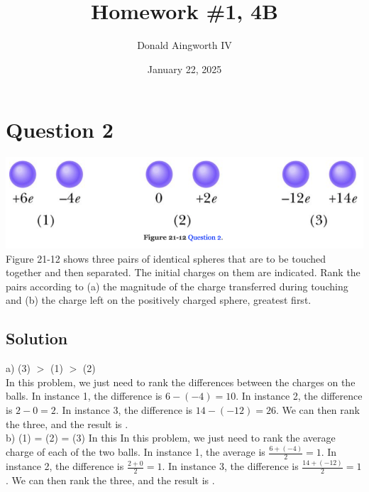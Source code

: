 \documentclass[12pt]{article}
\title{Homework \#1, 4B}
\author{Donald Aingworth IV}
\date{January 22, 2025}
\begin{document}

\maketitle

\pagebreak
\section*{Question 2}
\includegraphics[width=\textwidth]{picture_1.png}
Figure 21-12 shows three pairs of identical spheres that are to be touched together and then separated. The initial charges on them are indicated. Rank the pairs according to (a) the magnitude of the charge transferred during touching and (b) the charge left on the positively charged sphere, greatest first.

\subsection*{Solution}
a) (3) $>$ (1) $>$ (2)\\
In this problem, we just need to rank the differences between the charges on the balls. In instance 1, the difference is $6 - (-4) = 10$. In instance 2, the difference is $2 - 0 = 2$. In instance 3, the difference is $14 - (-12) = 26$. We can then rank the three, and the result is .\\
b) (1) = (2) = (3)
In this In this problem, we just need to rank the average charge of each of the two balls. In instance 1, the average is $\frac{6 + (-4)}{2} = 1$. In instance 2, the difference is $\frac{2 + 0}{2} = 1$. In instance 3, the difference is $\frac{14 + (-12)}{2} = 1$. We can then rank the three, and the result is .


\pagebreak
\end{document}
